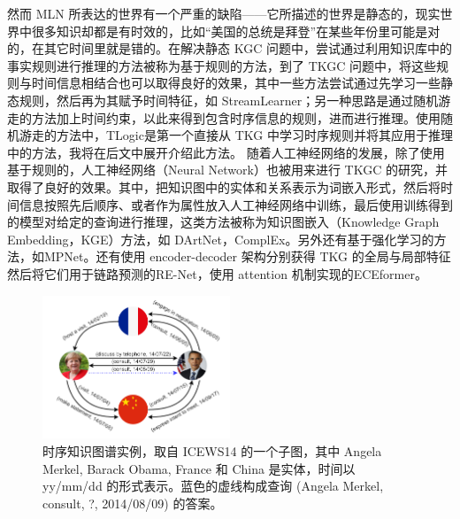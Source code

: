 \documentclass[a4paper, AutoFakeBold]{article}
\begin{document}
然而 MLN 所表达的世界有一个严重的缺陷——它所描述的世界是静态的，现实世界中很多知识却都是有时效的，比如“美国的总统是拜登”在某些年份里可能是对的，在其它时间里就是错的。在解决静态 KGC 问题中，尝试通过利用知识库中的事实规则进行推理的方法被称为基于规则的方法，到了 TKGC 问题中，将这些规则与时间信息相结合也可以取得良好的效果，其中一些方法尝试通过先学习一些静态规则，然后再为其赋予时间特征，如 StreamLearner\cite{11-2019}；另一种思路是通过随机游走的方法加上时间约束，以此来得到包含时序信息的规则，进而进行推理。使用随机游走的方法中，TLogic\cite{3-2022RefBlue}是第一个直接从 TKG 中学习时序规则并将其应用于推理中的方法，我将在后文中展开介绍此方法。
随着人工神经网络的发展，除了使用基于规则的，人工神经网络（Neural Network）也被用来进行 TKGC 的研究，并取得了良好的效果。其中，把知识图中的实体和关系表示为词嵌入形式，然后将时间信息按照先后顺序、或者作为属性放入人工神经网络中训练，最后使用训练得到的模型对给定的查询进行推理，这类方法被称为知识图嵌入（Knowledge Graph Embedding，KGE）方法，如 DArtNet\cite{5-2020}，ComplEx\cite{21-2016}。另外还有基于强化学习的方法，如MPNet\cite{4-2024RefBlue}。还有使用 encoder-decoder 架构分别获得 TKG 的全局与局部特征然后将它们用于链路预测的RE-Net\cite{12-2020RefBlue}，使用 attention\cite{10-2023RefBlue} 机制实现的ECEformer\cite{6-2024RefBlue}。



\begin{figure}
	\captionsetup{width=0.8\textwidth}
	\centering
	\includegraphics[width=0.5\textwidth]{figures/TKG.png}
	\caption{时序知识图谱实例，取自 ICEWS14 的一个子图，其中 Angela Merkel, Barack Obama, France 和 China 是实体，时间以 yy/mm/dd 的形式表示。蓝色的虚线构成查询 (Angela Merkel, consult, ?, 2014/08/09) 的答案。\cite{3-2022RefBlue}}
\end{figure}
\end{document}
